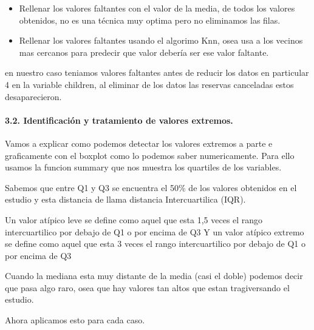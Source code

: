 \documentclass[]{article}
\let\oldparagraph\paragraph
\renewcommand{\paragraph}[1]{\oldparagraph{#1}\mbox{}}
\begin{document}
\begin{itemize}
\item
  Rellenar los valores faltantes con el valor de la media, de todos los
  valores obtenidos, no es una técnica muy optima pero no eliminamos las
  filas.
\item
  Rellenar los valores faltantes usando el algorimo Knn, osea usa a los
  vecinos mas cercanos para predecir que valor debería ser ese valor
  faltante.
\end{itemize}

en nuestro caso teniamos valores faltantes antes de reducir los datos en
particular 4 en la variable children, al eliminar de los datos las
reservas canceladas estos desaparecieron.

\hypertarget{identificaciuxf3n-y-tratamiento-de-valores-extremos.}{%
\paragraph{3.2. Identificación y tratamiento de valores
extremos.}\label{identificaciuxf3n-y-tratamiento-de-valores-extremos.}}

Vamos a explicar como podemos detectar los valores extremos a parte e
graficamente con el boxplot como lo podemos saber numericamente. Para
ello usamos la funcion summary que nos muestra los quartiles de los
variables.

Sabemos que entre Q1 y Q3 se encuentra el 50\% de los valores obtenidos
en el estudio y esta distancia de llama distancia Intercuartilica (IQR).

Un valor atípico leve se define como aquel que esta 1,5 veces el rango
intercuartilico por debajo de Q1 o por encima de Q3 Y un valor atípico
extremo se define como aquel que esta 3 veces el rango intercuartilico
por debajo de Q1 o por encima de Q3

Cuando la mediana esta muy distante de la media (casi el doble) podemos
decir que pasa algo raro, osea que hay valores tan altos que estan
tragiversando el estudio.

Ahora aplicamos esto para cada caso.
\end{document}
